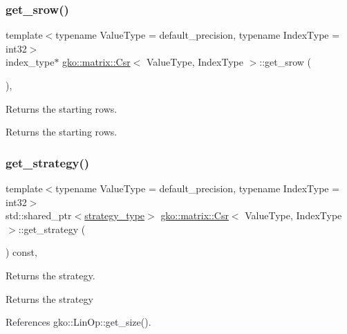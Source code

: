 \subsubsection{\texorpdfstring{get\+\_\+srow()}{get\_srow()}}
{\footnotesize\ttfamily template$<$typename Value\+Type = default\+\_\+precision, typename Index\+Type = int32$>$ \\
index\+\_\+type$\ast$ \hyperlink{classgko_1_1matrix_1_1Csr}{gko\+::matrix\+::\+Csr}$<$ Value\+Type, Index\+Type $>$\+::get\+\_\+srow (\begin{DoxyParamCaption}{ }\end{DoxyParamCaption})\hspace{0.3cm}{\ttfamily [inline]}, {\ttfamily [noexcept]}}



Returns the starting rows. 

\begin{DoxyReturn}{Returns}
the starting rows. 
\end{DoxyReturn}
\mbox{\label{classgko_1_1matrix_1_1Csr_ada0db14e65dfe027f483dc449f704a7e}} 
\subsubsection{\texorpdfstring{get\+\_\+strategy()}{get\_strategy()}}
{\footnotesize\ttfamily template$<$typename Value\+Type = default\+\_\+precision, typename Index\+Type = int32$>$ \\
std\+::shared\+\_\+ptr$<$\hyperlink{classgko_1_1matrix_1_1Csr_1_1strategy__type}{strategy\+\_\+type}$>$ \hyperlink{classgko_1_1matrix_1_1Csr}{gko\+::matrix\+::\+Csr}$<$ Value\+Type, Index\+Type $>$\+::get\+\_\+strategy (\begin{DoxyParamCaption}{ }\end{DoxyParamCaption}) const\hspace{0.3cm}{\ttfamily [inline]}, {\ttfamily [noexcept]}}



Returns the strategy. 

\begin{DoxyReturn}{Returns}
the strategy 
\end{DoxyReturn}


References gko\+::\+Lin\+Op\+::get\+\_\+size().

